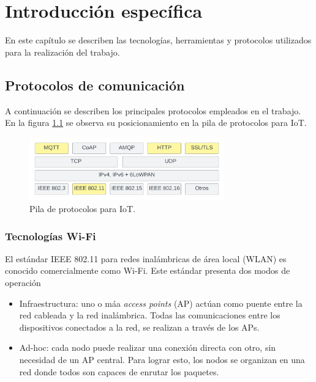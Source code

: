 \chapter{Introducción específica} %

\label{Chapter2}

En este capítulo se describen las tecnologías, herramientas y protocolos utilizados para la realización del trabajo.

\section{Protocolos de comunicación}
\label{sec:Protocolos de comunicación}
A continuación se describen los principales protocolos empleados en el trabajo. En la figura \ref{fig:IotProtocols} se observa su posicionamiento en la pila de protocolos para IoT.

\begin{figure}[h]
	\centering
	\includegraphics[width=0.75\textwidth]{./Figures/protocols.jpeg}
	\caption[Pila de protocolos para IoT.]{Pila de protocolos para IoT\protect\footnotemark.}
	\label{fig:IotProtocols}
\end{figure}


\subsection{Tecnologías Wi-Fi}
\label{sec:Tecnologías Wi-Fi}
El estándar IEEE 802.11 para redes inalámbricas de área local (WLAN) es conocido comercialmente como Wi-Fi. Este estándar presenta dos modos de operación \citep{wifi}
\begin{itemize}
\item Infraestructura: uno o máa \textit{access points} (AP) actúan como puente entre la red cableada y la red inalámbrica. Todas las comunicaciones entre los dispositivos conectados a la red, se realizan a través de los APs. 
\item Ad-hoc: cada nodo puede realizar una conexión directa con otro, sin necesidad de un AP central. Para lograr esto, los nodos se organizan en una red donde todos son capaces de enrutar los paquetes.  
\end{itemize}

